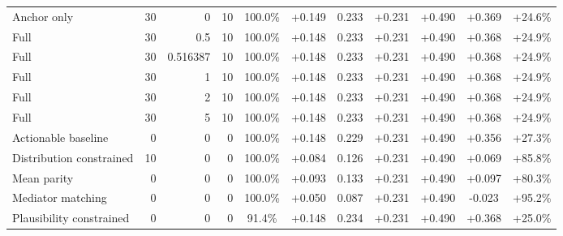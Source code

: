 \begin{table}[htbp]
\begin{tabular}{lrrrccccccc}
Anchor only & 30 & 0 & 10 & 100.0\% & +0.149 & 0.233 & +0.231 & +0.490 & +0.369 & +24.6\% \\
Full & 30 & 0.5 & 10 & 100.0\% & +0.148 & 0.233 & +0.231 & +0.490 & +0.368 & +24.9\% \\
Full & 30 & 0.516387 & 10 & 100.0\% & +0.148 & 0.233 & +0.231 & +0.490 & +0.368 & +24.9\% \\
Full & 30 & 1 & 10 & 100.0\% & +0.148 & 0.233 & +0.231 & +0.490 & +0.368 & +24.9\% \\
Full & 30 & 2 & 10 & 100.0\% & +0.148 & 0.233 & +0.231 & +0.490 & +0.368 & +24.9\% \\
Full & 30 & 5 & 10 & 100.0\% & +0.148 & 0.233 & +0.231 & +0.490 & +0.368 & +24.9\% \\
Actionable baseline & 0 & 0 & 0 & 100.0\% & +0.148 & 0.229 & +0.231 & +0.490 & +0.356 & +27.3\% \\
Distribution constrained & 10 & 0 & 0 & 100.0\% & +0.084 & 0.126 & +0.231 & +0.490 & +0.069 & +85.8\% \\
Mean parity & 0 & 0 & 0 & 100.0\% & +0.093 & 0.133 & +0.231 & +0.490 & +0.097 & +80.3\% \\
Mediator matching & 0 & 0 & 0 & 100.0\% & +0.050 & 0.087 & +0.231 & +0.490 & -0.023 & +95.2\% \\
Plausibility constrained & 0 & 0 & 0 & 91.4\% & +0.148 & 0.234 & +0.231 & +0.490 & +0.368 & +25.0\% \\
\bottomrule
\end{tabular}
\end{table}